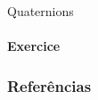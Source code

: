 \documentclass[aspectratio=169]{beamer}
\begin{document}
        





\begin{frame}{Quaternions}
    \framesubtitle{Exercice}

\end{frame}


\begin{frame}[t, allowframebreaks]
	\frametitle{Referências}
	
\end{frame}
\end{document}
